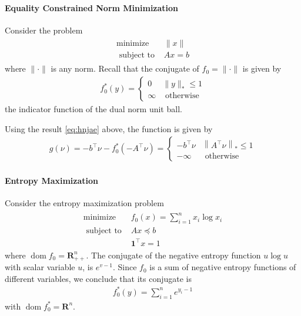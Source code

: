 \documentclass{article}
\begin{document}
\paragraph{Equality Constrained Norm Minimization}
Consider the problem
\begin{align*}
\begin{array}{ll}
\operatorname{minimize} & \|x\| \\
\text { subject to } & A x=b
\end{array}
\end{align*}
where $\|\cdot\|$ is any norm. Recall that the conjugate of $f_{0}=\|\cdot\|$ is given by
\begin{align*}
f_{0}^{*}(y)= \begin{cases}0 & \|y\|_{*} \leq 1 \\ \infty & \text { otherwise }\end{cases}
\end{align*}
the indicator function of the dual norm unit ball.

Using the result \cref{eq:hnjae} above, the  function  is given by
\begin{align*}
g(\nu)=-b^{\top} \nu-f_{0}^{*}\left(-A^{\top} \nu\right)= \begin{cases}-b^{\top} \nu & \left\|A^{\top} \nu\right\|_{*} \leq 1 \\ -\infty & \text { otherwise }\end{cases}
\end{align*}
\paragraph{Entropy Maximization}
Consider the entropy maximization problem
\begin{align*}
\begin{array}{ll}
\operatorname{minimize} & f_{0}(x)=\sum_{i=1}^{n} x_{i} \log x_{i} \\
\text { subject to } & A x \preceq b \\
& \mathbf{1}^{\top} x=1
\end{array}
\end{align*}
where $\operatorname{dom} f_{0}=\mathbf{R}_{++}^{n} .$ The conjugate of the negative entropy function $u \log u$ with scalar variable $u$, is $e^{v-1}$. Since $f_{0}$ is a sum of negative entropy functions of different variables, we conclude that its conjugate is
\begin{align*}
f_{0}^{*}(y)=\sum_{i=1}^{n} e^{y_{i}-1}
\end{align*}
with $\operatorname{dom} f_{0}^{*}=\mathbf{R}^{n}$.
\end{document}
